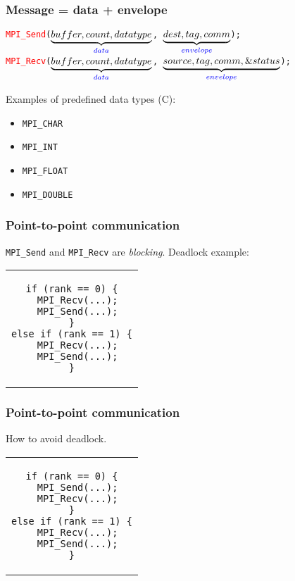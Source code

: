 \begin{frame}
  \frametitle{Message = data + envelope}
  \texttt{\textcolor{red}{MPI\_Send}($\underbrace{buffer, count, datatype}_{\textcolor{blue}{data}}$,
    $\underbrace{dest, tag, comm}_{\textcolor{blue}{envelope}}$); } \\
  \texttt{\textcolor{red}{MPI\_Recv}($\underbrace{buffer, count, datatype}_{\textcolor{blue}{data}}$,
    $\underbrace{source, tag, comm,\&status}_{\textcolor{blue}{envelope}}$); }

  Examples of predefined data types (C):
  \begin{itemize}
  \item \texttt{MPI\_CHAR}
  \item \texttt{MPI\_INT}
  \item \texttt{MPI\_FLOAT}
  \item \texttt{MPI\_DOUBLE}
  \end{itemize}
\end{frame}

\begin{frame}[fragile]
  \frametitle{Point-to-point communication}
  \texttt{MPI\_Send} and \texttt{MPI\_Recv} are \emph{blocking}. Deadlock
  example:
  \begin{center}
    \begin{tabular}{c}
\begin{lstlisting}[style=c,morekeywords={MPI_Recv,MPI_Send}]
if (rank == 0) {
  MPI_Recv(...);
  MPI_Send(...);
}
else if (rank == 1) {
  MPI_Recv(...);
  MPI_Send(...);
}
\end{lstlisting}
    \end{tabular}
  \end{center}
\end{frame}

\begin{frame}[fragile]
  \frametitle{Point-to-point communication}
  How to avoid deadlock.
  \begin{center}
    \begin{tabular}{c}
\begin{lstlisting}[style=c,morekeywords={MPI_Recv,MPI_Send}]
if (rank == 0) {
  MPI_Send(...);
  MPI_Recv(...);
}
else if (rank == 1) {
  MPI_Recv(...);
  MPI_Send(...);
}
\end{lstlisting}
    \end{tabular}
  \end{center}
\end{frame}

